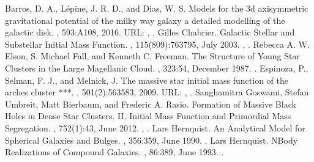 \documentclass[letterpaper,10pt,english]{sphinxmanual}
\begin{document}
\begin{sphinxthebibliography}{10}
\sphinxAtStartPar
Barros, D. A., Lépine, J. R. D., and Dias, W. S. Models for the 3d axisymmetric gravitational potential of the milky way galaxy \sphinxhyphen{} a detailed modelling of the galactic disk. , 593:A108, 2016. URL: , .
\sphinxAtStartPar
Gilles Chabrier. Galactic Stellar and Substellar Initial Mass Function. , 115(809):763\textendash{}795, July 2003. , .
\sphinxAtStartPar
Rebecca A. W. Elson, S. Michael Fall, and Kenneth C. Freeman. The Structure of Young Star Clusters in the Large Magellanic Cloud. , 323:54, December 1987. .
\sphinxAtStartPar
Espinoza, P., Selman, F. J., and Melnick, J. The massive star initial mass function of the arches cluster ***. , 501(2):563\textendash{}583, 2009. URL: , .
\sphinxAtStartPar
Sanghamitra Goswami, Stefan Umbreit, Matt Bierbaum, and Frederic A. Rasio. Formation of Massive Black Holes in Dense Star Clusters. II. Initial Mass Function and Primordial Mass Segregation. , 752(1):43, June 2012. , .
\sphinxAtStartPar
Lars Hernquist. An Analytical Model for Spherical Galaxies and Bulges. , 356:359, June 1990. .
\sphinxAtStartPar
Lars Hernquist. N\sphinxhyphen{}Body Realizations of Compound Galaxies. , 86:389, June 1993. .

\end{sphinxthebibliography}
\end{document}

